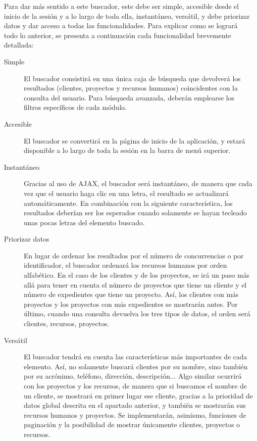 Para dar más sentido a este buscador, este debe ser simple, accesible desde el
inicio de la sesión y a lo largo de toda ella, instantáneo, versátil,
y debe priorizar datos y dar acceso a todas las funcionalidades. Para
explicar como se logrará todo lo anterior, se presenta a continuación cada
funcionalidad brevemente detallada:

\begin{description}
\item [Simple] El buscador consistirá en una única caja de búsqueda que
devolverá los resultados (clientes, proyectos y recursos humanos) coincidentes
con la consulta del usuario. Para búsqueda avanzada, deberán emplearse los
filtros específicos de cada módulo.

\item [Accesible] El buscador se convertirá en la página de inicio de la
aplicación, y estará disponible a lo largo de toda la sesión en la barra de
menú superior.

\item [Instantáneo] Gracias al uso de AJAX, el buscador será instantáneo, de
manera que cada vez que el usuario haga clic en una letra, el resultado se
actualizará automáticamente. En combinación con la siguiente característica,
los resultados deberían ser los esperados cuando solamente se hayan tecleado
unas pocas letras del elemento buscado.

\item [Priorizar datos] En lugar de ordenar los resultados por el número de
concurrencias o por identificador, el buscador ordenará los recursos humanos
por orden alfabético. En el caso de los clientes y de los proyectos, se irá un
paso más allá para tener en cuenta el número de proyectos que tiene un cliente
y el número de expedientes que tiene un proyecto. Así, los clientes con más
proyectos y los proyectos con más expedientes se mostrarán antes. Por último,
cuando una consulta devuelva los tres tipos de datos, el orden será clientes,
recursos, proyectos.

\item [Versátil] El buscador tendrá en cuenta las características más
importantes de cada elemento. Así, no solamente buscará clientes por su nombre,
sino también por su acrónimo, teléfono, dirección, descripción... Algo similar
ocurrirá con los proyectos y los recursos, de manera que si buscamos el nombre
de un cliente, se mostrará en primer lugar ese cliente, gracias a la prioridad
de datos global descrita en el apartado anterior, y también se mostrarán sus
recursos humanos y proyectos. Se implementarán, asimismo, funciones de
paginación y la posibilidad de mostrar únicamente clientes, proyectos o
recursos.


\end{description}
